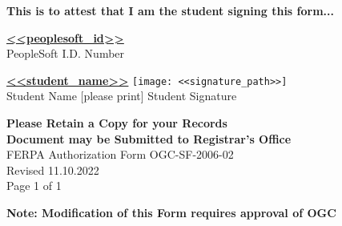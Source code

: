 \documentclass[12pt]{article}
\begin{document}
\vspace{0.3cm}
\textbf{This is to attest that I am the student signing this form...}

\vspace{0.6cm}
\underline{\textbf{<<peoplesoft_id>>}}\\
PeopleSoft I.D. Number

\vspace{0.3cm}
\underline{\textbf{<<student_name>>}} \hspace{0.5cm}
\texttt{[image: <<signature\_path>>]}\\
Student Name [please print] \hspace{2cm} Student Signature

\vspace{0.6cm}
\textbf{Please Retain a Copy for your Records}\\
\textbf{Document may be Submitted to Registrar’s Office}\\
FERPA Authorization Form OGC-SF-2006-02\\
Revised 11.10.2022\\
Page 1 of 1

\vfill
\hfill \textbf{Note: Modification of this Form requires approval of OGC}
\end{document}
